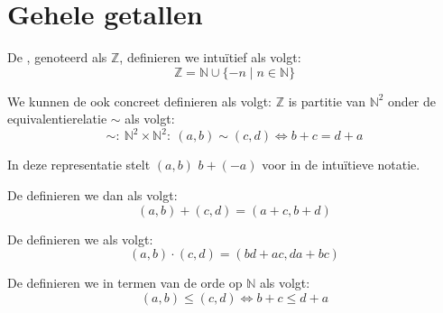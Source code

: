 \documentclass[main.tex]{subfiles}
\begin{document}
\section{Gehele getallen}
\label{sec:gehele-getallen}

\begin{de}
  De , genoteerd als $\mathbb{Z}$, definieren we intu\"itief als volgt:
  \[ \mathbb{Z} = \mathbb{N} \cup \{ -n \mid n\in \mathbb{N} \}  \]
\end{de}

\begin{de}
  We kunnen de  ook concreet definieren als volgt:
  $\mathbb{Z}$ is partitie van $\mathbb{N}^{2}$ onder de equivalentierelatie $\sim$ als volgt:
  \[ \sim:\ \mathbb{N}^{2} \times \mathbb{N}^{2}:\ (a,b) \sim (c,d) \Leftrightarrow b+c = d+a \]
\end{de}

\begin{opm}
  In deze representatie stelt $(a,b)$ $b+(-a)$ voor in de intu\"itieve notatie.
\end{opm}

\begin{de}
  De  definieren we dan als volgt:
  \[ (a,b) + (c,d) = (a+c,b+d) \]
\end{de}

\begin{de}
  De  definieren we als volgt:
  \[ (a,b) \cdot (c,d) = (bd+ac,da+bc) \]
\end{de}

\begin{de}
  De  definieren we in termen van de orde op $\mathbb{N}$ als volgt:
  \[ (a,b) \le (c,d) \Leftrightarrow b+c \le d+a \]
\end{de}
\end{document}
